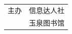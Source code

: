 \documentclass[a0paper,fleqn]{betterposter}
\begin{document}
{\begin{tabular}{l@{\quad}p{}}
主办 & 信息达人社\\
& 玉泉图书馆
\end{tabular}
}
\end{document}
